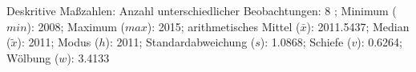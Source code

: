                     \begin{noten}
                	    \note{} Deskritive Maßzahlen:
                	    Anzahl unterschiedlicher Beobachtungen: 8%
                	    ; 
                	      Minimum ($min$): 2008; 
                	      Maximum ($max$): 2015; 
                	      arithmetisches Mittel ($\bar{x}$): \num[round-mode=places,round-precision=2]{2011,5437}; 
                	      Median ($\tilde{x}$): 2011; 
                	      Modus ($h$): 2011; 
                	      Standardabweichung ($s$): \num[round-mode=places,round-precision=2]{1,0868}; 
                	      Schiefe ($v$): \num[round-mode=places,round-precision=2]{0,6264}; 
                	      Wölbung ($w$): \num[round-mode=places,round-precision=2]{3,4133}
                     \end{noten}


